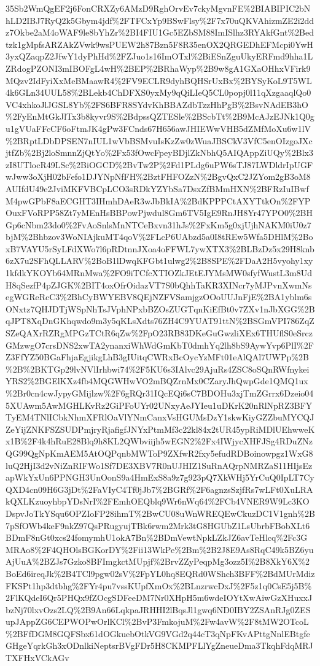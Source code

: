 \documentclass[11pt]{article}
\begin{document}
35Sb2WmQgEF2j6FonCRXZy6AMzD9RghOrvEv7ckyMgvnFE\%2BIABIPIC2bNhLD2IBJ7RyQ2k5Gbym4jdf\%2FTFCxYp9BSwFlsy\%2F7x70uQKVAhizmZE2i2ddz7Okbe2aM4oWAF9le8bYhZr\%2BI4FIU1Gc5EZbSM88ImISlhz3RYAkfGnt\%2Bedtzk1gMpfsARZAkZVwk9wsPUEW2h87Bzn5F8R35enOX2QRGEDhEFMcpi0YwH3yxQZaqpZ2JfwY1dyPhHd\%2FZJuo1s16ImOTxl\%2BiESnZguUkyERFmd9hha1LZRdogPZONI3mIBOFgL4wH\%2BEP\%2BRhaWyp\%2B9w8gA1GXaOHhxVFirk9MQzv2IdFyiXxMeBMaawR4\%2FV9ECLR9dyhBQHSrUxBx\%2BYSyKoL9T5WL4k6GLn34UUL58\%2BLekb4ChDFXS0yxMy9qQiLIeQ5CL0popj0l11qXzgaaqlQo0VC4xhkoJlJGSL8Yb\%2FS6BFR8SYdvKhBBAZdbTzzHhPgB\%2BsvNAdEB3hO\%2FyEnMtGkJlTx3b8kyvr9S\%2BdpssQZTESle\%2BScbTt\%2B9McAJzEJNk1Q0gu1gVUaFFcCF6oFtmJK4gPw3FCnds67H656awJHIEWwVHB5dZMfMoXu6w1lV\%2BRptLDbDPSEN7nIUL1wVbBSMvuIsKzZw0zWuaJBSCkV3VfC5enOIzgoJXcjtfZb\%2Bj2loSmnnZjQtYo\%2Fx53fOwcFpeyBDjlZkNbhQ5AIQAppZiUQy\%2Blx3zI8UTlocR49LSc\%2BiOGCD\%2BvTw2P\%2Fd1PLdg6uPW6sTJ87LWDldrIpUGFwJww3oXjH02bFefo1DJYNpNfFH\%2BztFHFOZzN\%2BgvQxC2JZYom2gB3oM8AUIfdU49e2JviMKFVBCpLCO3sRDkYZYbSa7DsxZfBMmHXN\%2BFRzIuIBwfM4pwGPbF8aECGHT3IHmhDAeR3wJbBkIA\%2BdKPPPCtAXYTtkOn\%2FYPOuxFVoRPP58Zt7yMEnHsBBPowPjwdul8Gm6TV5IgE9RnJH8Yr47YPO0\%2BHGp6cNbm23do0\%2FvAoSnlsMnNTCeBxvn31hJs\%2FxKm5g0xjUjhNAKM0iU0z7bjM\%2Bhbzov3WoNIAjkuMT4qoV\%2FLcP6UAbzd5a0I8tREw5Wfa5DHlM\%2BoxB7VAYU5rSyLFdXWo7l6pRDtnnJXoa4oFFWL7ywXTX3\%2BLBzDz5x29H8knb6zX7u2SFhQLLARV\%2BoB1lDwqKFGbt1ulwg2\%2B8SPE\%2FDaA2H5vyohy1xy1kfdkYKOYb64MRnMwa\%2FO9iTCfcXTIOZkJEtEJYMsMW0sfyfWustL3m8UdH8qSezfP4pZJGK\%2BIT4oxOfrOidazVT7S0bQhhTaKR3XINcr7yMJPvnXwmNsegWGReRcC3\%2BhCyBWYEBV8QEjNZFVSamjgzOOoUUJnFjE\%2BA1yblm6sONxtz7QHJDTjWSpNhTsJVphNPxbBZOsZUGTqnKiEfBt0v7ZXv1nJbXGG\%2BqJPT8XqDnGKhqwdo9m3y5qKLsXdts76ZH4C9YUAT91ttN\%2BSGmVPI786ZqZSZeQAXrRZRgMPGzTCtR6qZw\%2FpO23RB83DKeGuGwzliXEx6THUflS0eSrczGMzwgO7crsDNS2xwTA2ynanxiWhWdGmKbT0dmhYq2lh8bS9AywYvp6PlI\%2FZ3FfYZ50BGaFhjaEgjikgLhB3gIUitqCWRxBcOycYzMFt01eAlQAl7UWPp\%2B\%2B\%2BKTGp29lvNVlIrhbwi74\%2F5KU6s3IAlvc29AjuRs4ZSC8oSQnRWfnykeiYRS2\%2BGElKXz4fb4MQGWHwVO2mBQZrnMx0CZaryJhQwpGde1QMQ1ux\%2Br0cn4cwJypyGMijlzw\%2F6gRQr31IQcEQi6sC7BDOHu3xjTmZGrrx6Dzeio045XUAwm5AwMGHLKvRz2GiPFoUYr02UNxyAeJYIeu1uDKrK20nRlNpRZ3BFYTyEM4TNlICbkNhmXFRlOaVlYNmCanxVsHGUMsDzY1skwKiyGZZbuMYCQJZeYijZNKFSZSUDPmjryRjafigfJNYxPtmMf3c22kl84x2tUR45ypRiMDlUEhwweKx1B\%2F4k4hRuE28Blq9h8KL2QWbviijh5wEGN2\%2Fx4IWjycXHFJSg4RDuZNzQG99QgNpKmAEM5AtOQPqnbMWToP9ZXfwR2fxy5efudRDBoinowpgz1WxG8luQ2HjI3d2vNiZnRIFWo1Sf7DE3XBV7R0nUJHIZ1SuRnAQrpNMRZaS11HIjsEzapWkYxUn6PPNGH3UnOonS9a4HmExS8a9z7g923pQ7XkWHj5YrCuQ0IpLT7CyQXD4cn09H6G3jDt\%2FaVIyC4Tf0jJb7\%2BGRf\%2F6agnzsSzjfRs7wLFt0XuLRAkQXLKzuoyhbpYDsNrI\%2FEmhOEQblq9Wr6nWq64\%2FCb4VNER9W9Lc3KODspvJoTkYSqu6OPZIoFP28ihmT\%2BwCU08uWnWREQEwCkuzDC1V1gnh\%2B7pSfOWb4keF9nkZ97QsPRugyujTBk6rwm2Mrk3tG8HGUbZ1LsUbrbFBobXLt6BDmF8nGt0xcs24fomymhU1okA7Bn\%2BDmVewtNpkLZkJZ6avTeHlcq\%2Fc3GMRAo8\%2F4QHOlsBGKorDY\%2Fii13WkPe\%2Bm\%2B2J8E9As8RqC49k5BZ6yuAjUuA\%2BZJs7Gzko8BFImgkctMUpjf\%2BrvZZyPeqpMg3ozz5I\%2B8XkY6X\%2BoEd6ireqJk\%2B4TCl9pgw02sV\%2FpYL0hq8EQRd0WShch3BFF\%2BdMUrMdizFKSPt1hp3dtbhg\%2FYr4pu7vssKUpfXmOx\%2BLnzrwcDxJ\%2F5z1q0CsE5j5B\%2FlKQdeI6Qr5PHQx9fZOcgSDFeeDM7Nr0XHpH5m6wdeIOYtXwAiwGzXHuxxJbzNj70lxvOzs2LQ\%2B9An66LqkpaJRHHI2lBqsJl1gwq6ND0IBY2ZSAnRJg0ZESupJAppZG6CEPWOPwOrlKCl\%2BvP3FmkojuM\%2Fw4avW\%2F8tMW2OTcoL\%2BFfDGM8GQFSbx61dOGkuebOtkVG9VGd2q44cT3qNpFKvAPttgNnlEBtgfeGHgeYqrkGh3xODnlkiNeptsrBVgFDr5H8CKMPFLlYgZneueDma3TkqhFdqMRJTXFHxVCkAGv
\end{document}
